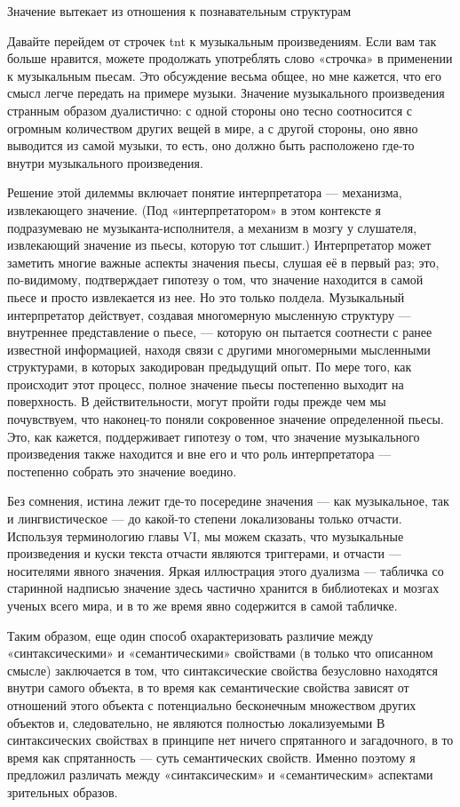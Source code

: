 \documentclass[../main.tex]{subfiles}
\begin{document}
Значение вытекает из отношения к познавательным структурам

Давайте перейдем от строчек \acs{tnt} к музыкальным произведениям. Если вам так больше нравится, можете продолжать употреблять слово «строчка» в применении к музыкальным пьесам. Это обсуждение весьма общее, но мне кажется, что его смысл легче передать на примере музыки. Значение музыкального произведения странным образом дуалистично: с одной стороны оно тесно соотносится с огромным количеством других вещей в мире, а с другой стороны, оно явно выводится из самой музыки, то есть, оно должно быть расположено где-то внутри музыкального произведения.

Решение этой дилеммы включает понятие интерпретатора --- механизма, извлекающего значение. (Под «интерпретатором» в этом контексте я подразумеваю не музыканта-исполнителя, а механизм в мозгу у слушателя, извлекающий значение из пьесы, которую тот слышит.) Интерпретатор может заметить многие важные аспекты значения пьесы, слушая её в первый раз; это, по-видимому, подтверждает гипотезу о том, что значение находится в самой пьесе и просто извлекается из нее. Но это только полдела. Музыкальный интерпретатор действует, создавая многомерную мысленную структуру --- внутреннее представление о пьесе, --- которую он пытается соотнести с ранее известной информацией, находя связи с другими многомерными мысленными структурами, в которых закодирован предыдущий опыт. По мере того, как происходит этот процесс, полное значение пьесы постепенно выходит на поверхность. В действительности, могут пройти годы прежде чем мы почувствуем, что наконец-то поняли сокровенное значение определенной пьесы. Это, как кажется, поддерживает гипотезу о том, что значение музыкального произведения также находится и вне его и что роль интерпретатора --- постепенно собрать это значение воедино.

Без сомнения, истина лежит где-то посередине значения --- как музыкальное, так и лингвистическое --- до какой-то степени локализованы только отчасти. Используя терминологию главы VI, мы можем сказать, что музыкальные произведения и куски текста отчасти являются триггерами, и отчасти --- носителями явного значения. Яркая иллюстрация этого дуализма --- табличка со старинной надписью значение здесь частично хранится в библиотеках и мозгах ученых всего мира, и в то же время явно содержится в самой табличке.

Таким образом, еще один способ охарактеризовать различие между «синтаксическими» и «семантическими» свойствами (в только что описанном смысле) заключается в том, что синтаксические свойства безусловно находятся внутри самого объекта, в то время как семантические свойства зависят от отношений этого объекта с потенциально бесконечным множеством других объектов и, следовательно, не являются полностью локализуемыми В синтаксических свойствах в принципе нет ничего спрятанного и загадочного, в то время как спрятанность --- суть семантических свойств. Именно поэтому я предложил различать между «синтаксическим» и «семантическим» аспектами зрительных образов.
\end{document}
